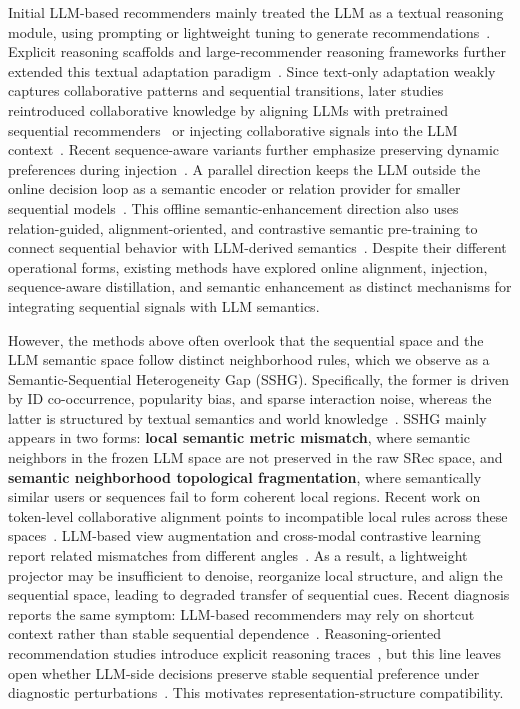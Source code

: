 ﻿\documentclass{article}
\begin{document}
Initial LLM-based recommenders mainly treated the LLM as a textual reasoning module, using prompting or lightweight tuning to generate recommendations~\cite{bao2023tallrec}. Explicit reasoning scaffolds and large-recommender reasoning frameworks further extended this textual adaptation paradigm~\cite{yu2026thinkrec,you2025r2ec}. Since text-only adaptation weakly captures collaborative patterns and sequential transitions, later studies reintroduced collaborative knowledge by aligning LLMs with pretrained sequential recommenders~\cite{liao2024llara} or injecting collaborative signals into the LLM context~\cite{zhang2025collm}. Recent sequence-aware variants further emphasize preserving dynamic preferences during injection~\cite{kim2025lost}. A parallel direction keeps the LLM outside the online decision loop as a semantic encoder or relation provider for smaller sequential models~\cite{ren2024rlmrec}. This offline semantic-enhancement direction also uses relation-guided, alignment-oriented, and contrastive semantic pre-training to connect sequential behavior with LLM-derived semantics~\cite{wang2025pad,cui2025sracl}. Despite their different operational forms, existing methods have explored online alignment, injection, sequence-aware distillation, and semantic enhancement as distinct mechanisms for integrating sequential signals with LLM semantics.

However, the methods above often overlook that the sequential space and the LLM semantic space follow distinct neighborhood rules, which we observe as a Semantic-Sequential Heterogeneity Gap (SSHG). Specifically, the former is driven by ID co-occurrence, popularity bias, and sparse interaction noise, whereas the latter is structured by textual semantics and world knowledge~\cite{lin2025survey}. SSHG mainly appears in two forms: \textbf{local semantic metric mismatch}, where semantic neighbors in the frozen LLM space are not preserved in the raw SRec space, and \textbf{semantic neighborhood topological fragmentation}, where semantically similar users or sequences fail to form coherent local regions. Recent work on token-level collaborative alignment points to incompatible local rules across these spaces~\cite{lin2026tca4rec}. LLM-based view augmentation and cross-modal contrastive learning report related mismatches from different angles~\cite{lu2025cllmrec,xu2024cmclrec}. As a result, a lightweight projector may be insufficient to denoise, reorganize local structure, and align the sequential space, leading to degraded transfer of sequential cues. Recent diagnosis reports the same symptom: LLM-based recommenders may rely on shortcut context rather than stable sequential dependence~\cite{kim2025lost,wang2026contextbias}. Reasoning-oriented recommendation studies introduce explicit reasoning traces~\cite{yu2026thinkrec}, but this line leaves open whether LLM-side decisions preserve stable sequential preference under diagnostic perturbations~\cite{kim2025lost}. This motivates representation-structure compatibility.
\end{document}
